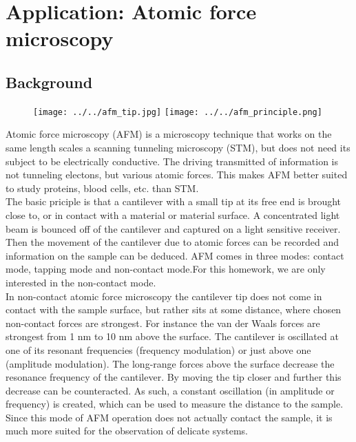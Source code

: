 \documentclass[12pt]{article}
\begin{document}
\section{Application: Atomic force microscopy}
\subsection{Background}
\begin{figure}[ht]
\texttt{[image: ../../afm\_tip.jpg]}
\texttt{[image: ../../afm\_principle.png]}
\end{figure}
Atomic force microscopy (AFM) is a microscopy technique that works on the same length scales a
scanning tunneling microscopy (STM), but does not need its subject to be electrically conductive.
The driving transmitted of information is not tunneling electons, but various atomic forces. This
makes AFM better suited to study proteins, blood cells, etc. than STM.\\


The basic priciple is that a cantilever with a small tip at its free end is brought close to, or in contact
with a material or material surface. A concentrated light beam is bounced off of the cantilever and
captured on a light sensitive receiver. Then the movement of the cantilever due to atomic forces can
be recorded and information on the sample can be deduced.
AFM comes in three modes: contact mode, tapping mode and non-contact mode.For this homework,
we are only interested in the non-contact mode.\\


In non-contact atomic force microscopy the cantilever tip does not come in contact with the sample
surface, but rather sits at some distance, where chosen non-contact forces are strongest. For instance
the van der Waals forces are strongest from 1 nm to 10 nm above the surface. The cantilever is oscillated
at one of its resonant frequencies (frequency modulation) or just above one (amplitude modulation).
The long-range forces above the surface decrease the resonance frequency of the cantilever. By moving
the tip closer and further this decrease can be counteracted. As such, a constant oscillation (in
amplitude or frequency) is created, which can be used to measure the distance to the sample. Since
this mode of AFM operation does not actually contact the sample, it is much more suited for the
observation of delicate systems.\\
\end{document}

